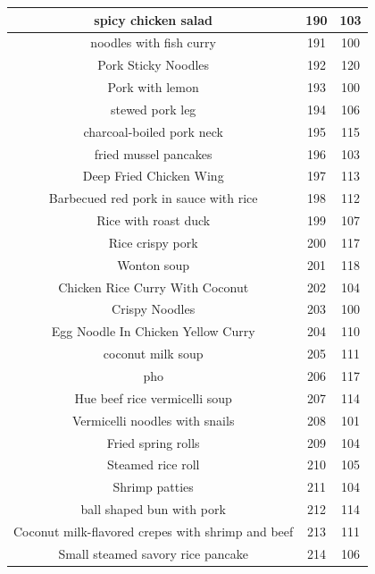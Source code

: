 {\begin{longtable}{| c | c | c|}
        \hline
        spicy chicken salad  &  190  &  103  \\
        \hline
        noodles with fish curry  &  191  &  100  \\
        \hline
        Pork Sticky Noodles  &  192  &  120  \\
        \hline
        Pork with lemon  &  193  &  100  \\
        \hline
        stewed pork leg  &  194  &  106  \\
        \hline
        charcoal-boiled pork neck  &  195  &  115  \\
        \hline
        fried mussel pancakes  &  196  &  103  \\
        \hline
        Deep Fried Chicken Wing  &  197  &  113  \\
        \hline
        Barbecued red pork in sauce with rice  &  198  &  112  \\
        \hline
        Rice with roast duck  &  199  &  107  \\
        \hline
        Rice crispy pork  &  200  &  117  \\
        \hline
        Wonton soup  &  201  &  118  \\
        \hline
        Chicken Rice Curry With Coconut  &  202  &  104  \\
        \hline
        Crispy Noodles  &  203  &  100  \\
        \hline
        Egg Noodle In Chicken Yellow Curry  &  204  &  110  \\
        \hline
        coconut milk soup  &  205  &  111  \\
        \hline
        pho  &  206  &  117  \\
        \hline
        Hue beef rice vermicelli soup  &  207  &  114  \\
        \hline
        Vermicelli noodles with snails  &  208  &  101  \\
        \hline
        Fried spring rolls  &  209  &  104  \\
        \hline
        Steamed rice roll  &  210  &  105  \\
        \hline
        Shrimp patties  &  211  &  104  \\
        \hline
        ball shaped bun with pork  &  212  &  114  \\
        \hline
        Coconut milk-flavored crepes with shrimp and beef  &  213  &  111  \\
        \hline
        Small steamed savory rice pancake  &  214  &  106  \\

\end{longtable}}
